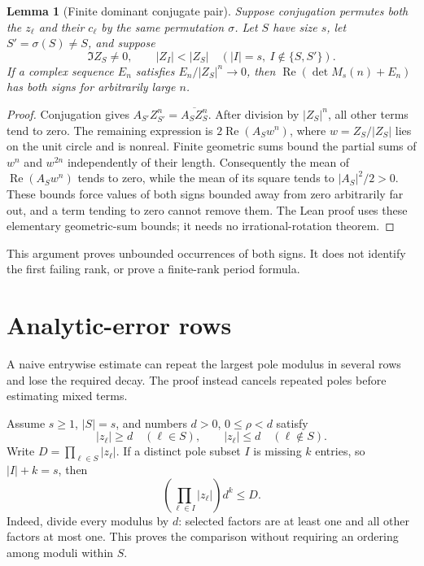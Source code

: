 \documentclass[11pt]{amsart}
\newtheorem{lemma}[theorem]{Lemma}
\newcommand{\Repart}{\operatorname{Re}}
\begin{document}
\begin{lemma}[Finite dominant conjugate pair]\label{lem:finite}
Suppose conjugation permutes both the $z_\ell$ and their $c_\ell$ by the same permutation $\sigma$. Let $S$ have size $s$, let $S'=\sigma(S)\ne S$, and suppose
\[
 \Im Z_S\ne0,\qquad
 |Z_I|<|Z_S|\quad (|I|=s,\ I\notin\{S,S'\}).
\]
If a complex sequence $E_n$ satisfies $E_n/|Z_S|^n\longrightarrow0$, then
$\Repart(\det M_s(n)+E_n)$ has both signs for arbitrarily large $n$.
\end{lemma}

\begin{proof}
Conjugation gives $A_{S'}Z_{S'}^n=\overline{A_SZ_S^n}$.
After division by $|Z_S|^n$, all other terms tend to zero. The remaining expression is
$2\Repart(A_Sw^n)$, where $w=Z_S/|Z_S|$ lies on the unit circle and is nonreal.
Finite geometric sums bound the partial sums of $w^n$ and $w^{2n}$ independently of their length. Consequently the mean of $\Repart(A_Sw^n)$ tends to zero, while the mean of its square tends to $|A_S|^2/2>0$. These bounds force values of both signs bounded away from zero arbitrarily far out, and a term tending to zero cannot remove them. The Lean proof uses these elementary geometric-sum bounds; it needs no irrational-rotation theorem.
\end{proof}

This argument proves unbounded occurrences of both signs. It does not identify the first failing rank, or prove a finite-rank period formula.

\section{Analytic-error rows}
A naive entrywise estimate can repeat the largest pole modulus in several rows and lose the required decay. The proof instead cancels repeated poles before estimating mixed terms.

Assume $s\ge1$, $|S|=s$, and numbers $d>0$, $0\le\rho<d$ satisfy
\[
 |z_\ell|\ge d\quad(\ell\in S),\qquad
 |z_\ell|\le d\quad(\ell\notin S).
\]
Write $D=\prod_{\ell\in S}|z_\ell|$. If a distinct pole subset $I$ is missing $k$ entries, so $|I|+k=s$, then
\begin{equation}\label{eq:ordered}
 \left(\prod_{\ell\in I}|z_\ell|\right)d^k\le D.
\end{equation}
Indeed, divide every modulus by $d$: selected factors are at least one and all other factors at most one. This proves the comparison without requiring an ordering among moduli within $S$.
\end{document}
